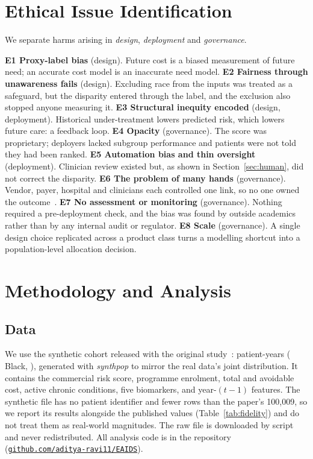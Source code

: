 \documentclass[conference]{IEEEtran}
\newcommand{\repo}{\href{https://github.com/aditya-ravi11/EAIDS}{\texttt{github.com/aditya-ravi11/EAIDS}}}
\begin{document}
\section{Ethical Issue Identification}
We separate harms arising in \emph{design}, \emph{deployment} and \emph{governance}.

\textbf{E1 Proxy-label bias} (design). Future cost is a biased measurement of future need; an accurate cost model is an inaccurate need model.
\textbf{E2 Fairness through unawareness fails} (design). Excluding race from the inputs was treated as a safeguard, but the disparity entered through the label, and the exclusion also stopped anyone measuring it.
\textbf{E3 Structural inequity encoded} (design, deployment). Historical under-treatment lowers predicted risk, which lowers future care: a feedback loop.
\textbf{E4 Opacity} (governance). The score was proprietary; deployers lacked subgroup performance and patients were not told they had been ranked.
\textbf{E5 Automation bias and thin oversight} (deployment). Clinician review existed but, as shown in Section~\ref{sec:human}, did not correct the disparity.
\textbf{E6 The problem of many hands} (governance). Vendor, payer, hospital and clinicians each controlled one link, so no one owned the outcome~\cite{nissenbaum1996}.
\textbf{E7 No assessment or monitoring} (governance). Nothing required a pre-deployment check, and the bias was found by outside academics rather than by any internal audit or regulator.
\textbf{E8 Scale} (governance). A single design choice replicated across a product class turns a modelling shortcut into a population-level allocation decision.

\section{Methodology and Analysis}
\label{sec:method}
\subsection{Data}
We use the synthetic cohort released with the original study~\cite{labsysmed}: \NPatients{} patient-years (\NBlack{} Black, \ShareBlack), generated with \emph{synthpop} to mirror the real data's joint distribution. It contains the commercial risk score, programme enrolment, total and avoidable cost, active chronic conditions, five biomarkers, and \NFeatures{} year-$(t-1)$ features. The synthetic file has no patient identifier and fewer rows than the paper's 100,009, so we report its results alongside the published values (Table~\ref{tab:fidelity}) and do not treat them as real-world magnitudes. The raw file is downloaded by script and never redistributed. All analysis code is in the repository (\repo).
\end{document}

